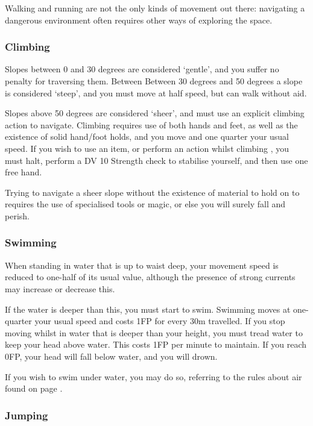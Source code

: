 Walking and running are not the only kinds of movement out there: navigating a dangerous environment often requires other ways of exploring the space. 

\subsubsection{Climbing}

Slopes between 0 and 30 degrees are considered `gentle', and you suffer no penalty for traversing them. Between  Between 30 degrees and 50 degrees a slope is considered `steep', and you must move at half speed, but can walk without aid. 

Slopes above 50 degrees are considered `sheer', and must use an explicit climbing action to navigate. Climbing requires use of both hands and feet, as well as the existence of solid hand/foot holds, and you move and one quarter your usual speed. If you wish to use an item, or perform an action whilst climbing , you must halt, perform a DV 10 Strength check to stabilise yourself, and then use one free hand. 

Trying to navigate a sheer slope without the existence of material to hold on to requires the use of specialised tools or magic, or else you will surely fall and perish. 

\subsubsection{Swimming}

When standing in water that is up to waist deep, your movement speed is reduced to one-half of its usual value, although the presence of strong currents may increase or decrease this. 

If the water is deeper than this, you must start to swim. Swimming moves at one-quarter your usual speed and costs 1FP for every 30m travelled. If you stop moving whilst in water that is deeper than your height, you must tread water to keep your head above water. This costs 1FP per minute to maintain. If you reach 0FP, your head will fall below water, and you will drown. 

If you wish to swim under water, you may do so, referring to the rules about air found on page \pageref{S:Air}. 

\subsubsection{Jumping}

